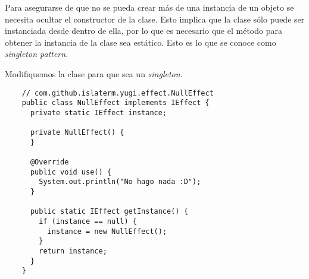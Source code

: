 \begin{Answer}[ref={ex:singleton-1}]
  Para asegurarse de que no se pueda crear más de una instancia de un objeto se necesita
  ocultar el constructor de la clase.
  Esto implica que la clase sólo puede ser instanciada desde dentro de ella, por lo que es
  necesario que el método para obtener la instancia de la clase sea estático.
  Esto es lo que se conoce como \textit{singleton pattern}.

  Modifiquemos la clase  para que sea un \textit{singleton}.
  \begin{verbatim}
    // com.github.islaterm.yugi.effect.NullEffect
    public class NullEffect implements IEffect {
      private static IEffect instance;

      private NullEffect() {
      }

      @Override
      public void use() {
        System.out.println("No hago nada :D");
      }

      public static IEffect getInstance() {
        if (instance == null) {
          instance = new NullEffect();
        }
        return instance;
      }
    }
  \end{verbatim}
\end{Answer}